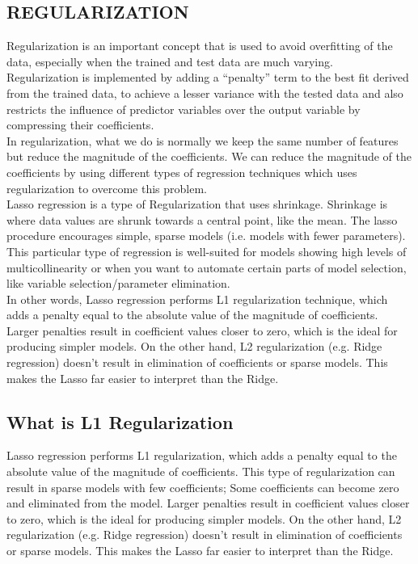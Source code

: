 \documentclass[a4paper,12pt,twoside]{book}
\begin{document}
\subsection{REGULARIZATION}
Regularization is an important concept that is used to avoid overfitting of the data, especially when the trained and test data are much varying.\\
Regularization is implemented by adding a “penalty” term to the best fit derived from the trained data, to achieve a lesser variance with the tested data and also restricts the influence of predictor variables over the output variable by compressing their coefficients.\\
In regularization, what we do is normally we keep the same number of features but reduce the magnitude of the coefficients. We can reduce the magnitude of the coefficients by using different types of regression techniques which uses regularization to overcome this problem.\\ 
Lasso regression is a type of Regularization that uses shrinkage. Shrinkage is where data values are shrunk towards a central point, like the mean. The lasso procedure encourages simple, sparse models (i.e. models with fewer parameters). This particular type of regression is well-suited for models showing high levels of multicollinearity or when you want to automate certain parts of model selection, like variable selection/parameter elimination. \\
In other words, Lasso regression performs L1 regularization technique, which adds a penalty equal to the absolute value of the magnitude of coefficients. Larger penalties result in coefficient values closer to zero, which is the ideal for producing simpler models. On the other hand, L2 regularization (e.g. Ridge regression) doesn’t result in elimination of coefficients or sparse models. This makes the Lasso far easier to interpret than the Ridge.\\
\subsection{What is L1 Regularization}
Lasso regression performs L1 regularization, which adds a penalty equal to the absolute value of the magnitude of coefficients. This type of regularization can result in sparse models with few coefficients; Some coefficients can become zero and eliminated from the model. Larger penalties result in coefficient values closer to zero, which is the ideal for producing simpler models. On the other hand, L2 regularization (e.g. Ridge regression) doesn’t result in elimination of coefficients or sparse models. This makes the Lasso far easier to interpret than the Ridge.\\
\end{document}
